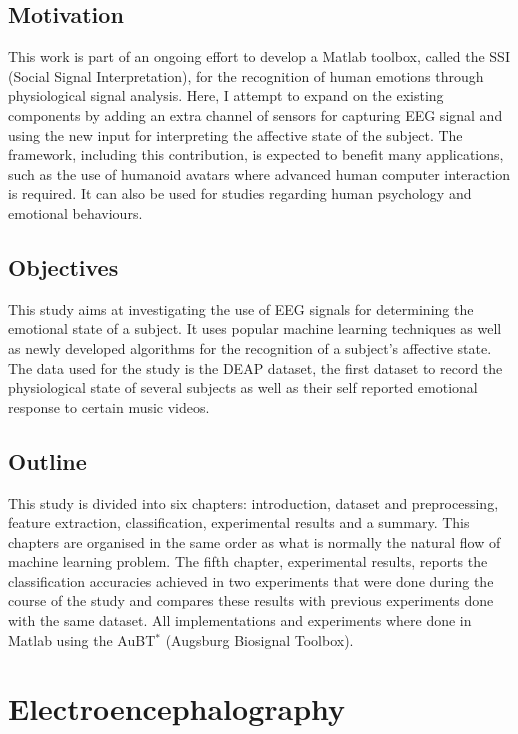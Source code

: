 \documentclass[12pt, a4paper, fleqn]{memoir}%
\begin{document}
\section{Motivation}
\label{sec:Motivation}
This work is part of an ongoing effort to develop a Matlab toolbox, called the SSI (Social Signal Interpretation), for the recognition of human emotions through physiological signal analysis. Here, I attempt to expand on the existing components by adding an extra channel of sensors for capturing EEG signal and using the new input for interpreting the affective state of the subject. The framework, including this contribution, is expected to benefit many applications, such as the use of humanoid avatars where advanced human computer interaction is required. It can also be used for studies regarding human psychology and emotional behaviours.
\section{Objectives}
\label{sec:Objectives}
This study aims at investigating the use of EEG signals for determining the emotional state of a subject. It uses popular machine learning techniques as well as newly developed algorithms for the recognition of a subject's affective state. The data used for the study is the DEAP dataset, the first dataset to record the physiological state of several subjects as well as their self reported emotional response to certain music videos. 
\section{Outline}
\label{sec:Outline}
This study is divided into six chapters: introduction, dataset and preprocessing, feature extraction, classification, experimental results and a summary. This chapters are organised in the same order as what is normally the natural flow of machine learning problem. The fifth chapter, experimental results, reports the classification accuracies achieved in two experiments that were done during the course of the study and compares these results with previous experiments done with the same dataset. All implementations and experiments where done in Matlab using the AuBT$^{*}$ (Augsburg Biosignal Toolbox).

\chapter{Electroencephalography}
\label{chap:Electroencephalography}
\end{document}
